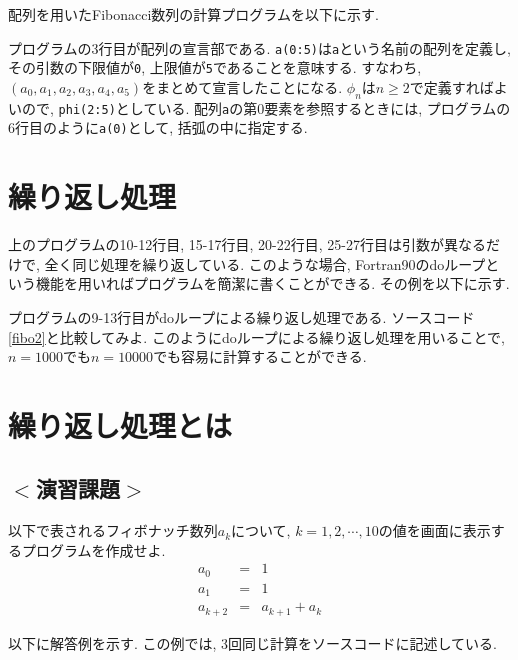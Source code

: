 配列を用いたFibonacci数列の計算プログラムを以下に示す. 


プログラムの3行目が配列の宣言部である. 
\verb|a(0:5)|は\verb|a|という名前の配列を定義し, その引数の下限値が\verb|0|, 上限値が\verb|5|であることを意味する. 
すなわち, $(a_0, a_1, a_2, a_3, a_4, a_5)$をまとめて宣言したことになる. 
$\phi_n$は$n\ge2$で定義すればよいので, \verb|phi(2:5)|としている. 
配列\verb|a|の第0要素を参照するときには, プログラムの6行目のように\verb|a(0)|として, 
括弧の中に指定する. 


\section{繰り返し処理}
上のプログラムの10-12行目, 15-17行目, 20-22行目, 25-27行目は引数が異なるだけで, 
全く同じ処理を繰り返している. 
このような場合, Fortran90のdoループという機能を用いればプログラムを簡潔に書くことができる. 
その例を以下に示す. 

プログラムの9-13行目がdoループによる繰り返し処理である. 
ソースコード\ref{fibo2}と比較してみよ. 
このようにdoループによる繰り返し処理を用いることで, $n=1000$でも$n=10000$でも容易に計算することができる. 





\section{繰り返し処理とは}
\subsection*{$<$演習課題$>$}
以下で表されるフィボナッチ数列$a_k$について, $k=1,2, \cdots, 10$の値を画面に表示するプログラムを作成せよ.  \\
\begin{eqnarray}
a_0 &=& 1 \\
a_1 &=& 1 \\
a_{k+2} &=& a_{k+1} + a_k
\end{eqnarray}

以下に解答例を示す. 
この例では, 3回同じ計算をソースコードに記述している. 



